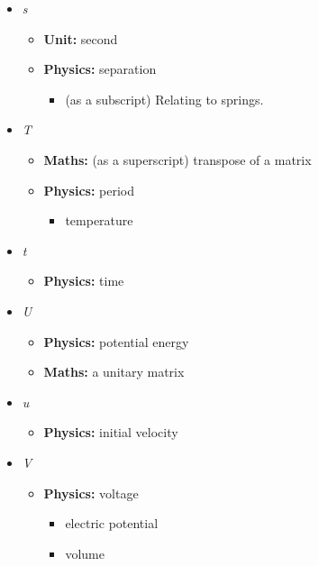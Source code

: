 \begin{itemize}
				\item \textit{s}
				\begin{itemize}
					\item\textbf{Unit:} second
					\item\textbf{Physics:} separation
					\begin{itemize}
						\item (as a subscript) Relating to springs.
					\end{itemize}
				\end{itemize}
				
				\item \textit{T}
				\begin{itemize}
					\item \textbf{Maths:} (as a superscript) transpose of a matrix
					\item\textbf{Physics:} period
					\begin{itemize}
						\item temperature                      
					\end{itemize}
				\end{itemize}
				
				\item \textit{t}
				\begin{itemize}
					\item\textbf{Physics:} time
				\end{itemize}
				
				\item \textit{U}
				\begin{itemize}
					\item\textbf{Physics:} potential energy
					\item\textbf{Maths:} a unitary matrix
				\end{itemize}
				
				\item \textit{u}
				\begin{itemize}
					\item\textbf{Physics:} initial velocity
				\end{itemize}
				
				\item \textit{V}
				\begin{itemize}
					\item\textbf{Physics:} voltage
					\begin{itemize}
						\item electric potential
						\item volume
					\end{itemize}
				\end{itemize}
				

\end{itemize}
